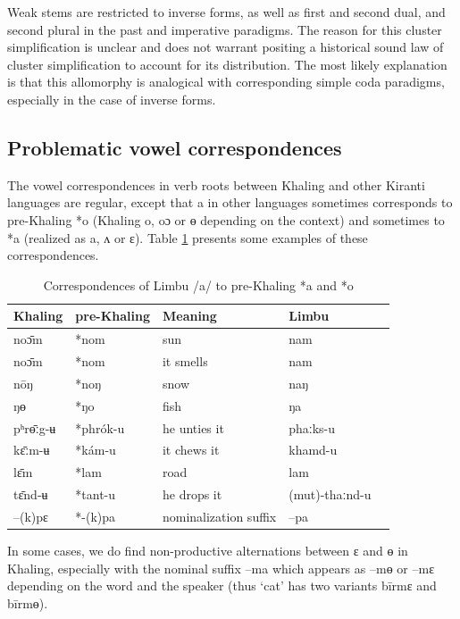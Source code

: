 \documentclass[oldfontcommands,oneside,a4paper,11pt]{article}
\newcommand{\ipa}[1]{{\phon \mbox{#1}}} %
\begin{document}
Weak stems are restricted to inverse forms, as well as first and second dual, and second plural in the past and imperative paradigms. The reason for this cluster simplification is unclear and does not warrant positing a historical sound law of cluster simplification to account for its distribution. The most likely explanation is that this allomorphy is analogical with corresponding simple coda paradigms, especially in the case of  inverse forms.


\subsection{Problematic vowel correspondences} \label{sec:vowel.correspondences}

The vowel correspondences in verb roots between Khaling and other Kiranti languages are regular, except that \ipa{a} in other languages sometimes corresponds to pre-Khaling  \ipa{*o} (Khaling \ipa{o}, \ipa{oɔ} or \ipa{ɵ} depending on the context) and sometimes to  \ipa{*a} (realized as \ipa{a}, \ipa{ʌ} or \ipa{ɛ}). Table \ref{tab:correspondances.a} presents some examples of these correspondences.
 
\begin{table}[h]
\caption{Correspondences of Limbu  /a/ to pre-Khaling  \ipa{*a} and  \ipa{*o}} \centering \label{tab:correspondances.a}
\begin{tabular}{lllll}
Khaling &   pre-Khaling & Meaning &   Limbu \\
\midrule
\ipa{noɔ̄m} &  \ipa{*nom} & sun &   \ipa{nam}\\
\ipa{noɔ̄m} &  \ipa{*nom} & it smells &   \ipa{nam}\\
\ipa{nōŋ} &  \ipa{*noŋ} & snow&   \ipa{naŋ}\\
\ipa{ŋɵ} &  \ipa{*ŋo} & fish&   \ipa{ŋa}\\
\ipa{pʰrɵ̄ːg-ʉ} &  \ipa{*phrók-u} & he unties it & \ipa{phaːks-u} \\
\midrule
\ipa{kɛ̄ːm-ʉ} &  \ipa{*kám-u} & it chews it & \ipa{khamd-u} \\
\ipa{lɛ̄m} &  \ipa{*lam} & road & \ipa{lam} \\
\ipa{tɛ̄nd-ʉ} & \ipa{*tant-u} & he drops it & \ipa{(mut)-thaːnd-u}\\
\ipa{--(k)pɛ} & \ipa{*-(k)pa} & nominalization suffix & \ipa{--pa} \\
\bottomrule
\end{tabular}
\end{table}
In some cases, we do find non-productive alternations between \ipa{ɛ} and \ipa{ɵ} in Khaling, especially with the nominal suffix \ipa{--ma} which appears as \ipa{--mɵ} or \ipa{--mɛ} depending on the word and the speaker (thus `cat' has two variants \ipa{bīrmɛ} and \ipa{bīrmɵ}). 
\end{document}
